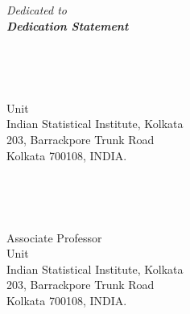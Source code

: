 \begin{titlepage}
\begin{center}
	\end{center}
\end{titlepage}


\newpage
~
\newpage
\section*{}
~\\~\\
\begin{center}
\textit{\Large Dedicated to}\\
 {\hspace{5cm}\textbf{\textit{\Large Dedication Statement}}}
\end{center}

\newpage
~
\newpage
\subsection*{}
\lipsum[1]

\vspace*{3cm}

\noindent \textbf{\scholar}\\
Unit\\
Indian Statistical Institute, Kolkata\\
203, Barrackpore Trunk Road\\
Kolkata 700108, INDIA.



\newpage
~
\newpage
\subsection*{}
\lipsum[2]

\vspace*{3cm}


\noindent\textbf{\super}\\
Associate Professor\\
Unit\\
Indian Statistical Institute, Kolkata\\
203, Barrackpore Trunk Road\\
Kolkata 700108, INDIA.



\cleardoublepage
\setcounter{savepage}{\thepage}

